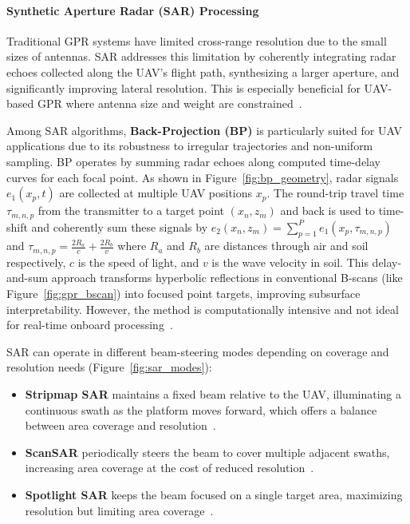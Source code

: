 

\paragraph{Synthetic Aperture Radar (SAR) Processing}

Traditional GPR systems have limited cross-range resolution due to the small sizes of antennas. SAR addresses this limitation by coherently integrating radar echoes collected along the UAV’s flight path, synthesizing a larger aperture, and significantly improving lateral resolution. This is especially beneficial for UAV-based GPR where antenna size and weight are constrained~\cite{alqudsi2021review}.

Among SAR algorithms, \textbf{Back-Projection (BP)} is particularly suited for UAV applications due to its robustness to irregular trajectories and non-uniform sampling. BP operates by summing radar echoes along computed time-delay curves for each focal point. As shown in Figure~\ref{fig:bp_geometry}, radar signals $e_1(x_p, t)$ are collected at multiple UAV positions $x_p$. The round-trip travel time $\tau_{m,n,p}$ from the transmitter to a target point $(x_n, z_m)$ and back is used to time-shift and coherently sum these signals by \(e_2(x_n, z_m) = \sum_{p=1}^{P} e_1(x_p, \tau_{m,n,p})\) and \(\tau_{m,n,p} = \frac{2R_a}{c} + \frac{2R_b}{v}\) where $R_a$ and $R_b$ are distances through air and soil respectively, $c$ is the speed of light, and $v$ is the wave velocity in soil. This delay-and-sum approach transforms hyperbolic reflections in conventional B-scans (like Figure~\ref{fig:gpr_bscan}) into focused point targets, improving subsurface interpretability. However, the method is computationally intensive and not ideal for real-time onboard processing~\cite{lei2014multi}.

SAR can operate in different beam-steering modes depending on coverage and resolution needs (Figure~\ref{fig:sar_modes}):

\begin{itemize}
    \item \textbf{Stripmap SAR} maintains a fixed beam relative to the UAV, illuminating a continuous swath as the platform moves forward, which offers a balance between area coverage and resolution~\cite{moreira2013tutorial}.
    \item \textbf{ScanSAR} periodically steers the beam to cover multiple adjacent swaths, increasing area coverage at the cost of reduced resolution~\cite{moreira2013tutorial}.
    \item \textbf{Spotlight SAR} keeps the beam focused on a single target area, maximizing resolution but limiting area coverage~\cite{moreira2013tutorial}.
\end{itemize}

